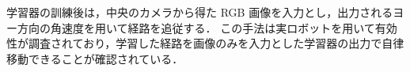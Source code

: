 学習器の訓練後は，中央のカメラから得た RGB 画像を入力とし，出力されるヨー方向の角速度を用いて経路を追従する．
この手法は実ロボットを用いて有効性が調査されており，学習した経路を画像のみを入力とした学習器の出力で自律移動できることが確認されている．
